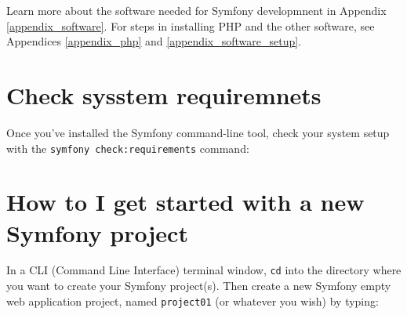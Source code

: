 \documentclass[a4paperpaper,openright]{book}
\newenvironment{Shaded}{}{}
\newcommand{\ExtensionTok}[1]{#1}
\newcommand{\NormalTok}[1]{#1}
\newcommand{\OperatorTok}[1]{\textcolor[rgb]{0.40,0.40,0.40}{#1}}
\begin{document}
Learn more about the software needed for Symfony developmnent in
Appendix \ref{appendix_software}. For steps in installing PHP and the
other software, see Appendices \ref{appendix_php} and
\ref{appendix_software_setup}.

\hypertarget{check-sysstem-requiremnets}{%
\section{Check sysstem requiremnets}\label{check-sysstem-requiremnets}}

Once you've installed the Symfony command-line tool, check your system
setup with the \texttt{symfony\ check:requirements} command:

\begin{Shaded}
\end{Shaded}

\hypertarget{how-to-i-get-started-with-a-new-symfony-project}{%
\section{How to I get started with a new Symfony
project}\label{how-to-i-get-started-with-a-new-symfony-project}}

In a CLI (Command Line Interface) terminal window, \texttt{cd} into the
directory where you want to create your Symfony project(s). Then create
a new Symfony empty web application project, named \texttt{project01}
(or whatever you wish) by typing:
\end{document}
